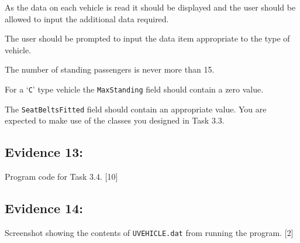 As the data on each vehicle is read it should be displayed and the
user should be allowed to input the additional data required.

The user should be prompted to input the data item appropriate to
the type of vehicle.

The number of standing passengers is never more than 15.

For a \textquoteleft \texttt{C}\textquoteright{} type vehicle the
\texttt{MaxStanding} field should contain a zero value. 

The \texttt{SeatBeltsFitted} field should contain an appropriate value.
You are expected to make use of the classes you designed in Task 3.3.

\subsection*{Evidence 13: }

Program code for Task 3.4.\hfill{} {[}10{]}

\subsection*{Evidence 14: }

Screenshot showing the contents of \texttt{UVEHICLE.dat} from running
the program.\hfill{} {[}2{]}